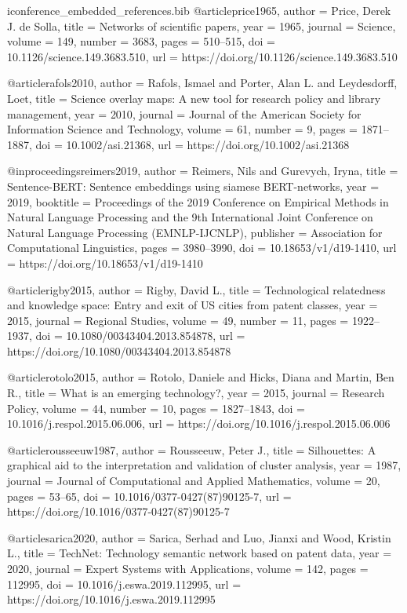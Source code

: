 \begin{filecontents*}[overwrite]{iconference_embedded_references.bib}
@article{price1965,
  author = {Price, Derek J. de Solla},
  title = {Networks of scientific papers},
  year = {1965},
  journal = {Science},
  volume = {149},
  number = {3683},
  pages = {510--515},
  doi = {10.1126/science.149.3683.510},
  url = {https://doi.org/10.1126/science.149.3683.510}
}

@article{rafols2010,
  author = {Rafols, Ismael and Porter, Alan L. and Leydesdorff, Loet},
  title = {Science overlay maps: A new tool for research policy and library management},
  year = {2010},
  journal = {Journal of the American Society for Information Science and Technology},
  volume = {61},
  number = {9},
  pages = {1871--1887},
  doi = {10.1002/asi.21368},
  url = {https://doi.org/10.1002/asi.21368}
}

@inproceedings{reimers2019,
  author = {Reimers, Nils and Gurevych, Iryna},
  title = {{Sentence-BERT}: Sentence embeddings using siamese {BERT}-networks},
  year = {2019},
  booktitle = {Proceedings of the 2019 Conference on Empirical Methods in Natural Language Processing and the 9th International Joint Conference on Natural Language Processing (EMNLP-IJCNLP)},
  publisher = {Association for Computational Linguistics},
  pages = {3980--3990},
  doi = {10.18653/v1/d19-1410},
  url = {https://doi.org/10.18653/v1/d19-1410}
}

@article{rigby2015,
  author = {Rigby, David L.},
  title = {Technological relatedness and knowledge space: Entry and exit of {US} cities from patent classes},
  year = {2015},
  journal = {Regional Studies},
  volume = {49},
  number = {11},
  pages = {1922--1937},
  doi = {10.1080/00343404.2013.854878},
  url = {https://doi.org/10.1080/00343404.2013.854878}
}

@article{rotolo2015,
  author = {Rotolo, Daniele and Hicks, Diana and Martin, Ben R.},
  title = {What is an emerging technology?},
  year = {2015},
  journal = {Research Policy},
  volume = {44},
  number = {10},
  pages = {1827--1843},
  doi = {10.1016/j.respol.2015.06.006},
  url = {https://doi.org/10.1016/j.respol.2015.06.006}
}

@article{rousseeuw1987,
  author = {Rousseeuw, Peter J.},
  title = {Silhouettes: A graphical aid to the interpretation and validation of cluster analysis},
  year = {1987},
  journal = {Journal of Computational and Applied Mathematics},
  volume = {20},
  pages = {53--65},
  doi = {10.1016/0377-0427(87)90125-7},
  url = {https://doi.org/10.1016/0377-0427(87)90125-7}
}

@article{sarica2020,
  author = {Sarica, Serhad and Luo, Jianxi and Wood, Kristin L.},
  title = {{TechNet}: Technology semantic network based on patent data},
  year = {2020},
  journal = {Expert Systems with Applications},
  volume = {142},
  pages = {112995},
  doi = {10.1016/j.eswa.2019.112995},
  url = {https://doi.org/10.1016/j.eswa.2019.112995}
}


\end{filecontents*}
